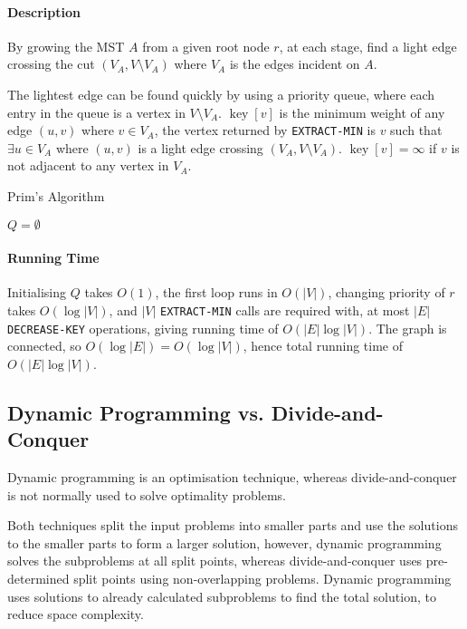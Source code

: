 \documentclass[10pt]{article}
\begin{document}
\paragraph{Description}By growing the MST $A$ from a given root node $r$, at each stage, find a light edge crossing the cut $(V_A,V\setminus V_A)$ where $V_A$ is the edges incident on $A$.

The lightest edge can be found quickly by using a priority queue, where each entry in the queue is a vertex in $V\setminus V_A$.  $\mathop{key}[v]$ is the minimum weight of any edge $(u,v)$ where $v\in V_A$, the vertex returned by \texttt{EXTRACT-MIN} is $v$ such that $\exists u\in V_A$ where $(u,v)$ is a light edge crossing $(V_A,V\setminus V_A)$. $\mathop{key}[v]=\infty$ if $v$ is not adjacent to any vertex in $V_A$.
\begin{algorithm}
	\caption{Prim's Algorithm}
	$Q=\emptyset$\;
\end{algorithm}
\paragraph{Running Time}Initialising $Q$ takes $O(1)$, the first loop runs in $O(|V|)$, changing priority of $r$ takes $O(\log|V|)$, and $|V|$ \texttt{EXTRACT-MIN} calls are required with, at most $|E|$ \texttt{DECREASE-KEY} operations, giving running time of $O(|E|\log|V|)$.  The graph is connected, so $O(\log |E|)=O(\log|V|)$, hence total running time of $O(|E|\log |V|)$.
\subsection{Dynamic Programming vs. Divide-and-Conquer}
Dynamic programming is an optimisation technique, whereas divide-and-conquer is not normally used to solve optimality problems.

Both techniques split the input problems into smaller parts and use the solutions to the smaller parts to form a larger solution, however, dynamic programming solves the subproblems at all split points, whereas divide-and-conquer uses pre-determined split points using non-overlapping problems.  Dynamic programming uses solutions to already calculated subproblems to find the total solution, to reduce space complexity.
\end{document}
